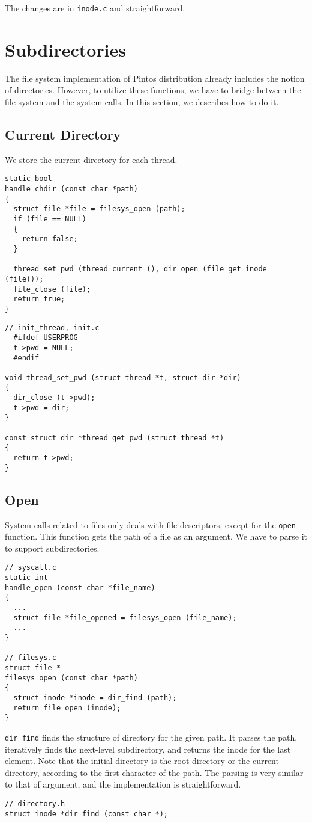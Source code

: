 \documentclass[a4paper,article,11pt,oneside]{article}
\begin{document}
The changes are in \texttt{inode.c} and straightforward.

\section{Subdirectories}\label{secdir}
The file system implementation of Pintos distribution already includes
the notion of directories. However, to utilize these functions,
we have to bridge between the file system and the system calls. In
this section, we describes how to do it.

\subsection{Current Directory}
We store the current directory for each thread.
\begin{verbatim}
static bool
handle_chdir (const char *path)
{
  struct file *file = filesys_open (path);
  if (file == NULL)
  {
    return false;
  }

  thread_set_pwd (thread_current (), dir_open (file_get_inode (file)));
  file_close (file);
  return true;
}
\end{verbatim}
\begin{verbatim}
// init_thread, init.c
  #ifdef USERPROG
  t->pwd = NULL;
  #endif

void thread_set_pwd (struct thread *t, struct dir *dir)
{
  dir_close (t->pwd);
  t->pwd = dir;
}

const struct dir *thread_get_pwd (struct thread *t)
{
  return t->pwd;
}
\end{verbatim}

\subsection{Open}
System calls related to files only deals with file descriptors,
except for the \texttt{open} function. This function gets the path of
a file as an argument. We have to parse it to support subdirectories.

\begin{verbatim}
// syscall.c
static int
handle_open (const char *file_name)
{
  ...
  struct file *file_opened = filesys_open (file_name);
  ...
}

// filesys.c
struct file *
filesys_open (const char *path)
{
  struct inode *inode = dir_find (path);
  return file_open (inode);
}
\end{verbatim}

\texttt{dir\_find} finds the structure of directory for the given
path. It parses the path, iteratively finds the next-level
subdirectory, and returns the inode for the last element. Note that
the initial directory is the root directory or the current directory,
according to the first character of the path. The parsing is very
similar to that of argument, and the implementation is
straightforward.
\begin{verbatim}
// directory.h
struct inode *dir_find (const char *);
\end{verbatim}
\end{document}
